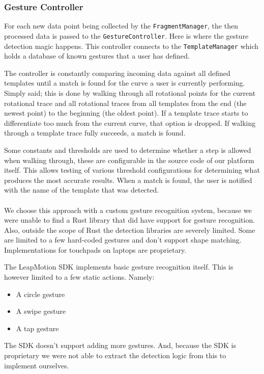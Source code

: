 \documentclass{standalone}
\begin{document}
  \subsubsection{Gesture Controller}
  For each new data point being collected by the \verb_FragmentManager_, the
  then processed data is passed to the \verb_GestureController_. Here is where
  the gesture detection magic happens. This controller connects to the
  \verb_TemplateManager_ which holds a database of known gestures that a user
  has defined.

  The controller is constantly comparing incoming data against all
  defined templates until a match is found for the curve a user is currently
  performing. Simply said; this is done by walking through all rotational points
  for the current rotational trace and all rotational traces from all templates
  from the end (the newest point) to the beginning (the oldest point). If a
  template trace starts to differentiate too much from the current curve, that
  option is dropped. If walking through a template trace fully succeeds, a
  match is found.

  Some constants and thresholds are used to determine whether a
  step is allowed when walking through, these are configurable in the source
  code of our platform itself. This allows testing of various threshold
  configurations for determining what produces the most accurate results.
  When a match is found, the user is notified with the name of the template that
  was detected.

  \paragraph{}
  We choose this approach with a custom gesture recognition system, because we
  were unable to find a Rust library that did have support for gesture
  recognition. Also, outside the scope of Rust the detection libraries are
  severely limited. Some are limited to a few hard-coded gestures and don't
  support shape matching. Implementations for touchpads on laptops are
  proprietary.

  The LeapMotion SDK implements basic gesture recognition itself. This is
  however limited to a few static actions. Namely:
  \begin{itemize}
    \tightlist{}
    \item A circle gesture
    \item A swipe gesture
    \item A tap gesture
  \end{itemize}
  The SDK doesn't support adding more gestures. And, because the SDK is
  proprietary we were not able to extract the detection logic from this to
  implement ourselves.
\end{document}
